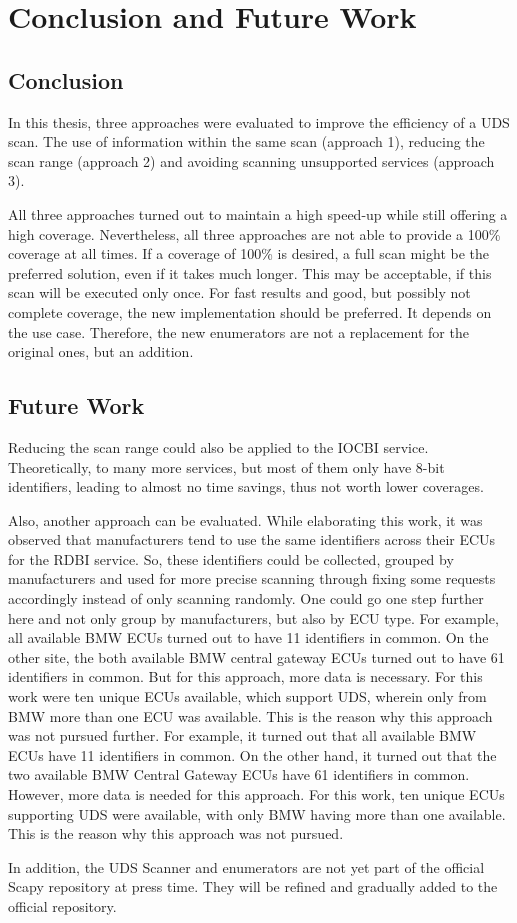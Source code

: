 \section{Conclusion and Future Work}

\subsection{Conclusion}

In this thesis, three approaches were evaluated to improve the efficiency of a UDS scan. The use of information within the same scan (approach 1), reducing the scan range (approach 2) and avoiding scanning unsupported services (approach 3).

All three approaches turned out to maintain a high speed-up while still offering a high coverage.
Nevertheless, all three approaches are not able to provide a 100\% coverage at all times. 
If a coverage of 100\% is desired, a full scan might be the preferred solution, even if it takes much longer. This may be acceptable, if this scan will be executed only once. For fast results and good, but possibly not complete coverage, the new implementation should be preferred. It depends on the use case. Therefore, the new enumerators are not a replacement for the original ones, but an addition.

\subsection{Future Work}

Reducing the scan range could also be applied to the IOCBI service. Theoretically, to many more services, but most of them only have 8-bit identifiers, leading to almost no time savings, thus not worth lower coverages.

Also, another approach can be evaluated. While elaborating this work, it was observed that manufacturers tend to use the same identifiers across their ECUs for the RDBI service. So, these identifiers could be collected, grouped by manufacturers and used for more precise scanning through fixing some requests accordingly instead of only scanning randomly. One could go one step further here and not only group by manufacturers, but also by ECU type.
For example, all available BMW ECUs turned out to have 11 identifiers in common. On the other site, the both available BMW central gateway ECUs turned out to have 61 identifiers in common. But for this approach, more data is necessary. For this work were ten unique ECUs available, which support UDS, wherein only from BMW more than one ECU was available. This is the reason why this approach was not pursued further.
For example, it turned out that all available BMW ECUs have 11 identifiers in common. On the other hand, it turned out that the two available BMW Central Gateway ECUs have 61 identifiers in common. However, more data is needed for this approach. For this work, ten unique ECUs supporting UDS were available, with only BMW having more than one available. This is the reason why this approach was not pursued.

In addition, the UDS Scanner and enumerators are not yet part of the official Scapy repository at press time. They will be refined and gradually added to the official repository.

